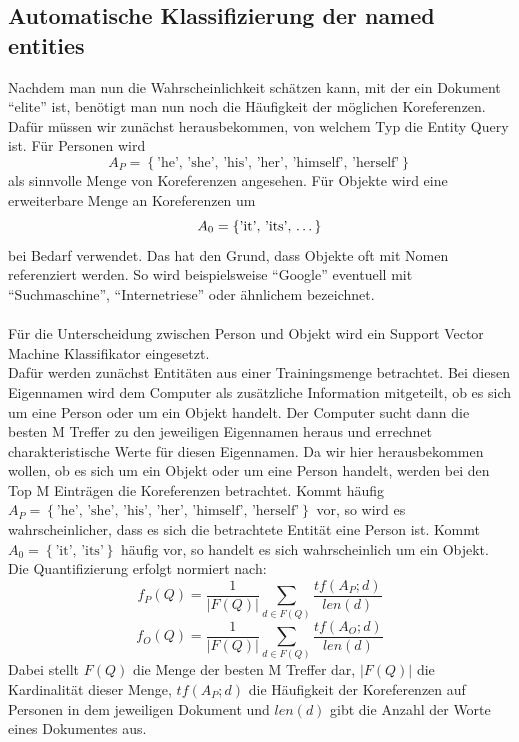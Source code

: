 \subsection{Automatische Klassifizierung der named entities}
Nachdem man nun die Wahrscheinlichkeit schätzen kann, mit der ein Dokument ``elite'' ist, benötigt man nun noch die Häufigkeit der möglichen Koreferenzen.\\
Dafür müssen wir zunächst herausbekommen, von welchem Typ die Entity Query ist. Für Personen wird
\[A_P=\left\{ \text{'he', 'she', 'his', 'her', 'himself', 'herself'} \right\}\]
als sinnvolle Menge von Koreferenzen angesehen. Für Objekte wird eine erweiterbare Menge an Koreferenzen um
\[A_0=\left\{ \text{'it', 'its', \dots} \right\}\]
bei Bedarf verwendet. Das hat den Grund, dass Objekte oft mit Nomen referenziert werden. So wird beispielsweise ``Google'' eventuell mit ``Suchmaschine'', ``Internetriese'' oder ähnlichem bezeichnet.\\
\\
Für die Unterscheidung zwischen Person und Objekt wird ein Support Vector Machine Klassifikator eingesetzt.\\
Dafür werden zunächst Entitäten aus einer Trainingsmenge betrachtet. Bei diesen Eigennamen wird dem Computer als zusätzliche Information mitgeteilt, ob es sich um eine Person oder um ein Objekt handelt. Der Computer sucht dann die besten M Treffer zu den jeweiligen Eigennamen heraus und errechnet charakteristische Werte für diesen Eigennamen. Da wir hier herausbekommen wollen, ob es sich um ein Objekt oder um eine Person handelt, werden bei den Top M Einträgen die Koreferenzen betrachtet. Kommt häufig $A_P=\left\{ \text{'he', 'she', 'his', 'her', 'himself', 'herself'} \right\}$ vor, so wird es wahrscheinlicher, dass es sich die betrachtete Entität eine Person ist. Kommt $A_0=\left\{ \text{'it', 'its'} \right\}$ häufig vor, so handelt es sich wahrscheinlich um ein Objekt. Die Quantifizierung erfolgt normiert nach:
\[f_P\left( Q \right)=\frac{1}{|F\left( Q \right)|}\sum_{d\in F\left( Q \right)} \frac{tf\left( A_P;d \right)}{len \left( d \right)}\]
\[f_O\left( Q \right)=\frac{1}{|F\left( Q \right)|}\sum_{d\in F\left( Q \right)} \frac{tf\left( A_O;d \right)}{len \left( d \right)}\]
Dabei stellt $F\left( Q \right)$ die Menge der besten M Treffer dar, $|F\left( Q \right)|$ die Kardinalität dieser Menge, $tf\left( A_P;d \right)$ die Häufigkeit der Koreferenzen auf Personen in dem jeweiligen Dokument und $len\left( d \right)$ gibt die Anzahl der Worte eines Dokumentes aus.\\
